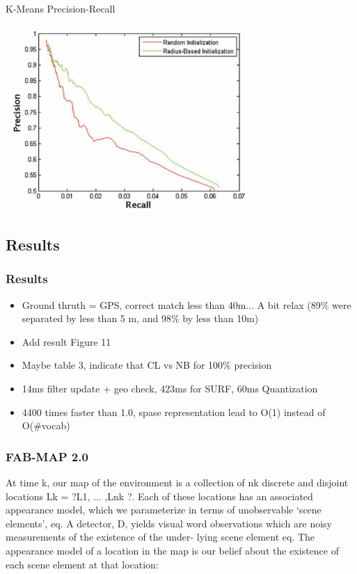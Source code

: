 \begin{frame}[t]{K-Means Precision-Recall}
    \begin{center}
        \includegraphics[width=0.7\textwidth]{./media/precision_recall_kmeans.png}
    \end{center}
\end{frame}

\subsection{Results}
\begin{frame}
    \frametitle{Results}
    \begin{itemize}
        \item Ground thruth = GPS, correct match less than 40m... A bit relax (89\% were separated by less than 5 m, and 98\% by less than 10m)
        \item Add result Figure 11
        \item Maybe table 3, indicate that CL vs NB for 100\% precision
        \item 14ms filter update + geo check, 423ms for SURF, 60ms Quantization
        \item 4400 times faster than 1.0, spase representation lead to O(1) instead of O(\#vocab)
    \end{itemize}
\end{frame}


\begin{frame}
    \frametitle{FAB-MAP 2.0}
    At time k, our map of the environment is a collection of nk discrete and disjoint locations Lk = ?L1, ... ,Lnk ?. Each of these locations has an associated appearance model, which we parameterize in terms of unobservable ‘scene elements’, eq. A detector, D, yields visual word observations which are noisy measurements of the existence of the under- lying scene element eq. The appearance model of a location in the map is our belief about the existence of each scene element at that location:
\end{frame}

